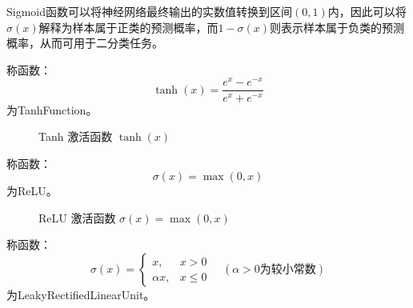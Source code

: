 \begin{note}
	Sigmoid函数可以将神经网络最终输出的实数值转换到区间$(0,1)$内，因此可以将$\sigma(x)$解释为样本属于正类的预测概率，而$1-\sigma(x)$则表示样本属于负类的预测概率，从而可用于二分类任务。
\end{note}
\begin{definition}
	称函数：
	\begin{equation*}
		\tanh(x)=\frac{e^x - e^{-x}}{e^x + e^{-x}}
	\end{equation*}
	为\gls{TanhFunction}。
\end{definition}
\begin{figure}[H]
	\centering
	\caption{Tanh 激活函数 $\tanh(x)$}
\end{figure}
\begin{definition}
	称函数：
	\begin{equation*}
		\sigma(x)=\max(0,x)
	\end{equation*}
	为\gls{ReLU}。
\end{definition}
\begin{figure}[H]
	\centering
	\caption{ReLU 激活函数 $\sigma(x)=\max(0,x)$}
\end{figure}
\begin{definition}
	称函数：
	\begin{equation*}
		\sigma(x)=
		\begin{cases}
			x,& x>0 \\
			\alpha x, & x\leqslant 0
		\end{cases}
		\quad (\alpha>0 \text{为较小常数})
	\end{equation*}
	为\gls{LeakyRectifiedLinearUnit}。
\end{definition}
